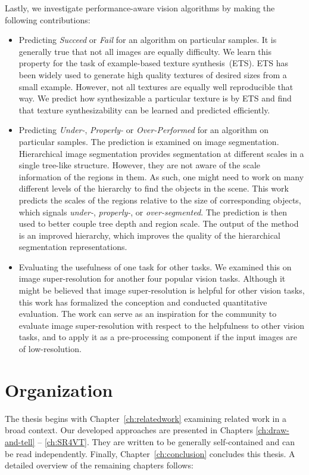 Lastly, we investigate performance-aware vision algorithms by making the following contributions:  
\begin{itemize}
\item  Predicting \emph{Succeed} or \emph {Fail}  for an algorithm on particular samples. 
 It is generally true that not all images are equally difficulty. We learn this property for the task of example-based texture synthesis~(ETS). ETS has been widely used to
  generate high quality textures of desired sizes from a small
  example. However, not all textures are equally well reproducible
  that way. We predict how synthesizable a particular texture
  is by ETS and find that texture synthesizability can be learned and predicted efficiently. 

\item  Predicting \emph{Under-}, \emph{Properly-} or \emph{Over-Performed} for an algorithm on particular samples. The prediction is examined on image segmentation.  Hierarchical image segmentation provides segmentation at different scales in a single tree-like structure. However, they are not aware of the scale information of the regions in them.
As such, one might need to work on many different levels of the hierarchy to find the objects in the scene.
This work predicts the  scales of the regions relative to the size of corresponding objects, which signals  \emph{under-}, \emph{properly-}, or \emph{over-segmented}.  The prediction is then used to better couple tree depth  and region scale.
The output of the method is an improved hierarchy, which improves the quality of the hierarchical segmentation representations.
  
\item  Evaluating the usefulness of one task for other tasks. We examined this on image super-resolution for another four popular vision tasks.  Although it might be believed that image super-resolution is helpful for other vision tasks, this work has formalized the conception and conducted quantitative evaluation.
The work can serve as an inspiration for the community  to evaluate image super-resolution with respect to the helpfulness to other vision tasks, and to apply it as a pre-processing component if the input images are of low-resolution. 

\end{itemize}


\section{Organization} 
The thesis begins with Chapter~\ref{ch:relatedwork} examining related work in a broad context.   Our developed approaches are presented in Chapters \ref{ch:draw-and-tell} -- \ref{ch:SR4VT}. They are written to be generally self-contained and can be read independently. Finally,  Chapter~\ref{ch:conclusion} concludes this thesis. A detailed overview of the remaining chapters follows:

